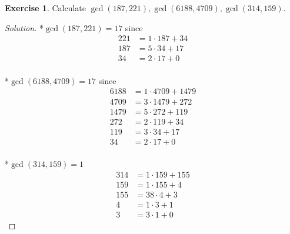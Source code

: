 \documentclass{article}
\theoremstyle{definition}
\newtheorem{exercise}{Exercise}
\begin{document}
\newpage

\begin{exercise} \label{c1-ex-3}
Calculate $\gcd(187, 221), \gcd(6188, 4709), \gcd(314, 159)$.
\end{exercise}
\begin{proof}[Solution]
*$\gcd(187, 221) = 17$ since
\begin{align*}
221 & = 1 \cdot 187 + 34 \\
187 & = 5 \cdot 34 + 17 \\
34 & = 2 \cdot 17 + 0
\end{align*}
\\
*$\gcd(6188, 4709) = 17$ since
\begin{align*}
6188 & = 1 \cdot 4709 + 1479 \\
4709 & = 3 \cdot 1479 + 272 \\
1479 & = 5 \cdot 272 + 119 \\
272 & = 2 \cdot 119 + 34 \\
119 & = 3 \cdot 34 + 17 \\
34 & = 2 \cdot 17 + 0
\end{align*}
\\
*$\gcd(314, 159) = 1$
\begin{align*}
314 & = 1 \cdot 159 + 155 \\
159 & = 1 \cdot 155 + 4 \\
155 & = 38 \cdot 4 + 3 \\
4 & = 1 \cdot 3 + 1 \\
3 & = 3 \cdot 1 + 0
\end{align*}
\end{proof}

\newpage
\end{document}
